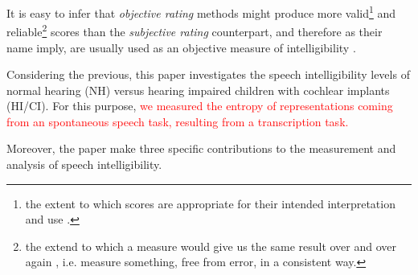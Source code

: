 It is easy to infer that \textit{objective rating} methods might produce more valid\footnote{the extent to which scores are appropriate for their intended interpretation and use \citep{Lesterhuis_2018, Trochim_2022}.} and reliable\footnote{the extend to which a measure would give us the same result over and over again \citep{Trochim_2022}, i.e. measure something, free from error, in a consistent way.} scores than the \textit{subjective rating} counterpart, and therefore as their name imply, are usually used as an objective measure of intelligibility \citep{Boonen_et_al_2021, Faes_et_al_2021}.

Considering the previous, this paper investigates the speech intelligibility levels of normal hearing (NH) versus hearing impaired children with cochlear implants (HI/CI). For this purpose, \textcolor{red}{we measured the entropy of representations coming from an spontaneous speech task, resulting from a transcription task.} 

\begin{comment}
add previous evidence about this comparison
\end{comment}

Moreover, the paper make three specific contributions to the measurement and analysis of speech intelligibility. 

\begin{comment}
First, we develop a novel analysis of speech intelligibility using a latent variable approach \cite{Everitt_1984}. More specifically, we model SI as a latent variable inferred from entropy measures coming from the transcription task. This method has XX specific benefits. First, it allows to construct a speech intelligibility score at the children level, which in turn allow us to make comparisons at the individual level. Second, it allow us to control for different types of sources of variation: individual variation (some hypothesis say there is a lot variation in this level), block effects (coming from the experimental design), and measurement error (resulting from the nested structure of measurement), which later allow us to test hypothesis at appropriate levels. Finally, it also measures the reliability (variability) of the transcription task.

Second, we describe in detail the sources of variation in speech intelligibility based on a set of covariates of interest. We supplement our description of the sources of variation with a causal analysis of the factors influencing this variation mention evidence on hearing age, etiology and pta. It is important to understand that a cochlear implant partially restores a severe-to-profound sensorineural hearing loss, i.e. the signal provided by the apparatus is still degraded compared to the signal in normal hearing (Drennan, \& Rubinstein, 2008). However, even under this condition, the device enables children with severe-to-profound hearing impairment to perceive speech and other environmental sounds.

Finally, we wrap the full analysis procedure under the bayesian framework, providing the steps, assumptions and computational implementation of the method.
\end{comment}
